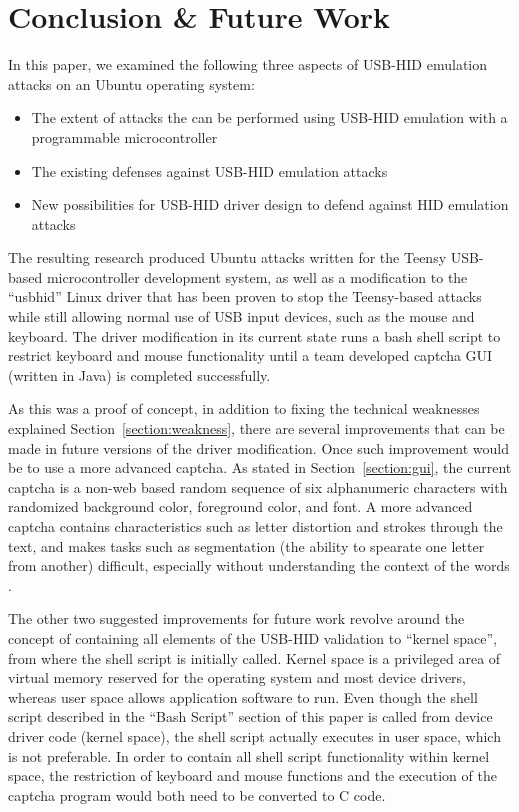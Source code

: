 \documentclass[pagenumbers]{ieee}
\begin{document}

\section{Conclusion \& Future Work}

In this paper, we examined the following three aspects of USB-HID emulation attacks on an Ubuntu operating system:

\begin{itemize}
\item The extent of attacks the can be performed using USB-HID emulation with a programmable microcontroller
\item The existing defenses against USB-HID emulation attacks
\item New possibilities for USB-HID driver design to defend against HID emulation attacks
\end{itemize}

The resulting research produced Ubuntu attacks written for the Teensy USB-based microcontroller development system, as well as a modification to the ``usbhid'' Linux driver that has been proven to stop the Teensy-based attacks while still allowing normal use of USB input devices, such as the mouse and keyboard. The driver modification in its current state runs a bash shell script to restrict keyboard and mouse functionality until a team developed captcha GUI (written in Java) is completed successfully.

As this was a proof of concept, in addition to fixing the technical weaknesses explained Section~\ref{section:weakness}, there are several improvements that can be made in future versions of the driver modification. Once such improvement would be to use a more advanced captcha. As stated in Section~\ref{section:gui}, the current captcha is a non-web based random sequence of six alphanumeric characters with randomized background color, foreground color, and font. A more advanced captcha contains characteristics such as letter distortion and strokes through the text, and makes tasks such as segmentation (the ability to spearate one letter from another) difficult, especially without understanding the context of the words \cite{captcha}.

The other two suggested improvements for future work revolve around the concept of containing all elements of the USB-HID validation to ``kernel space'', from where the shell script is initially called. Kernel space is a privileged area of virtual memory reserved for the operating system and most device drivers, whereas user space allows application software to run. Even though the shell script described in the ``Bash Script'' section of this paper is called from device driver code (kernel space), the shell script actually executes in user space, which is not preferable. In order to contain all shell script functionality within kernel space, the restriction of keyboard and mouse functions and the execution of the captcha program would both need to be converted to C code. 
\end{document}
